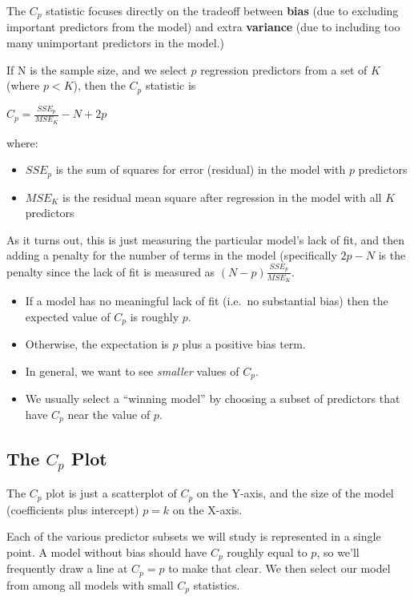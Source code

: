 \documentclass[]{book}
\providecommand{\tightlist}{%
  \setlength{\itemsep}{0pt}\setlength{\parskip}{0pt}}
\theoremstyle{definition}
\theoremstyle{definition}
\theoremstyle{definition}
\theoremstyle{remark}
\begin{document}
The \(C_p\) statistic focuses directly on the tradeoff between
\textbf{bias} (due to excluding important predictors from the model) and
extra \textbf{variance} (due to including too many unimportant
predictors in the model.)

If N is the sample size, and we select \(p\) regression predictors from
a set of \(K\) (where \(p < K\)), then the \(C_p\) statistic is

\(C_p = \frac{SSE_p}{MSE_K} - N + 2p\)

where:

\begin{itemize}
\tightlist
\item
  \(SSE_p\) is the sum of squares for error (residual) in the model with
  \(p\) predictors
\item
  \(MSE_K\) is the residual mean square after regression in the model
  with all \(K\) predictors
\end{itemize}

As it turns out, this is just measuring the particular model's lack of
fit, and then adding a penalty for the number of terms in the model
(specifically \(2p - N\) is the penalty since the lack of fit is
measured as \((N-p) \frac{SSE_p}{MSE_K}\).

\begin{itemize}
\tightlist
\item
  If a model has no meaningful lack of fit (i.e.~no substantial bias)
  then the expected value of \(C_p\) is roughly \(p\).
\item
  Otherwise, the expectation is \(p\) plus a positive bias term.
\item
  In general, we want to see \emph{smaller} values of \(C_p\).
\item
  We usually select a ``winning model'' by choosing a subset of
  predictors that have \(C_p\) near the value of \(p\).
\end{itemize}

\subsection{\texorpdfstring{The \(C_p\)
Plot}{The C\_p Plot}}\label{the-c_p-plot}

The \(C_p\) plot is just a scatterplot of \(C_p\) on the Y-axis, and the
size of the model (coefficients plus intercept) \(p = k\) on the X-axis.

Each of the various predictor subsets we will study is represented in a
single point. A model without bias should have \(C_p\) roughly equal to
\(p\), so we'll frequently draw a line at \(C_p = p\) to make that
clear. We then select our model from among all models with small \(C_p\)
statistics.
\end{document}
